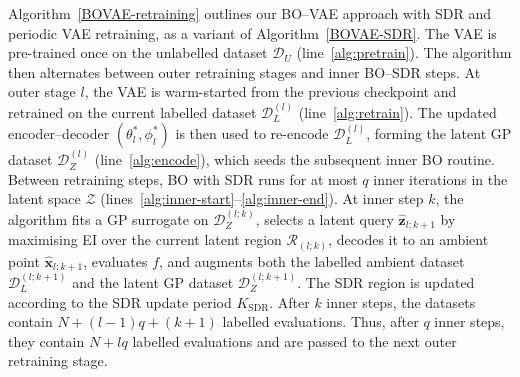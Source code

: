 \documentclass[pdflatex,sn-mathphys-num]{sn-jnl}%
\theoremstyle{thmstyleone}%
\theoremstyle{thmstyletwo}%
\theoremstyle{thmstylethree}%
\begin{document}
Algorithm~\ref{BOVAE-retraining} outlines our BO--VAE approach with SDR and periodic VAE retraining, as a variant of Algorithm~\ref{BOVAE-SDR}. The VAE is pre-trained once on the unlabelled dataset \(\mathcal D_U\) (line~\ref{alg:pretrain}). The algorithm then alternates between outer retraining stages and inner BO--SDR steps. At outer stage \(l\), the VAE is warm-started from the previous checkpoint and retrained on the current labelled dataset \(\mathcal D_L^{(l)}\) (line~\ref{alg:retrain}). The updated encoder--decoder \((\theta_l^\ast,\phi_l^\ast)\) is then used to re-encode \(\mathcal D_L^{(l)}\), forming the latent GP dataset \(\mathcal D_Z^{(l)}\) (line~\ref{alg:encode}), which seeds the subsequent inner BO routine. Between retraining steps, BO with SDR runs for at most \(q\) inner iterations in the latent space \(\mathcal Z\) (lines~\ref{alg:inner-start}--\ref{alg:inner-end}). At inner step \(k\), the algorithm fits a GP surrogate on \(\mathcal D_Z^{(l;k)}\), selects a latent query \(\hat{\mathbf z}_{l;k+1}\) by maximising EI over the current latent region \(\mathcal R_{(l;k)}\), decodes it to an ambient point \(\hat{\mathbf x}_{l;k+1}\), evaluates \(f\), and augments both the labelled ambient dataset \(\mathcal D_L^{(l;k+1)}\) and the latent GP dataset \(\mathcal D_Z^{(l;k+1)}\). The SDR region is updated according to the SDR update period \(K_{\mathrm{SDR}}\). After \(k\) inner steps, the datasets contain \(N+(l-1)q+(k+1)\) labelled evaluations. Thus, after \(q\) inner steps, they contain \(N+lq\) labelled evaluations and are passed to the next outer retraining stage.
\end{document}
